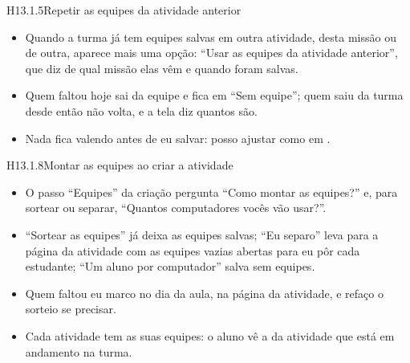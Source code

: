 \begin{historia}{H13.1.5}{Repetir as equipes da atividade anterior}{\pronto}
\aceite
\begin{itemize}
  \item Quando a turma já tem equipes salvas em outra atividade, desta missão
    ou de outra, aparece mais uma opção: \enquote{Usar as equipes da atividade
    anterior}, que diz de qual missão elas vêm e quando foram salvas.
  \item Quem faltou hoje sai da equipe e fica em \enquote{Sem equipe}; quem saiu
    da turma desde então não volta, e a tela diz quantos são.
  \item Nada fica valendo antes de eu salvar: posso ajustar como em
    .
\end{itemize}
\end{historia}

\begin{historia}{H13.1.8}{Montar as equipes ao criar a atividade}{\pronto}
\aceite
\begin{itemize}
  \item O passo \enquote{Equipes} da criação pergunta \enquote{Como montar as
    equipes?} e, para sortear ou separar, \enquote{Quantos computadores vocês
    vão usar?}.
  \item \enquote{Sortear as equipes} já deixa as equipes salvas; \enquote{Eu
    separo} leva para a página da atividade com as equipes vazias abertas para
    eu pôr cada estudante; \enquote{Um aluno por computador} salva sem equipes.
  \item Quem faltou eu marco no dia da aula, na página da atividade, e refaço o
    sorteio se precisar.
  \item Cada atividade tem as suas equipes: o aluno vê a da atividade que está
    em andamento na turma.
\end{itemize}
\end{historia}

